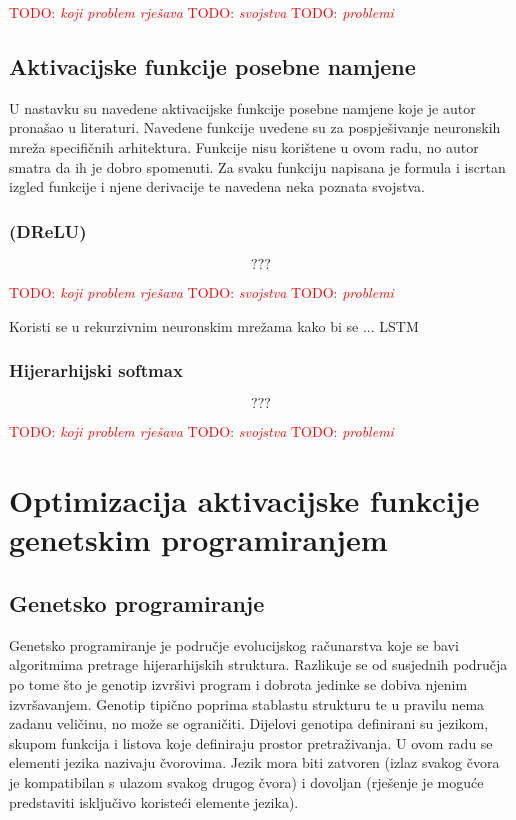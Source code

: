 \documentclass[times, utf8, numeric, diplomski]{fer}
\def\TODO#1{\noindent\textcolor{red}{TODO: \textit{#1}}\newline}
\def\todo#1{\TODO{#1}}
\def\todoimg#1{\begin{center} \textcolor{red}{\big[ IMAGE: \textit{#1} \big]} \end{center}}
\begin{document}
\todo{koji problem rješava}
\todo{svojstva}
\todo{problemi}

\section{Aktivacijske funkcije posebne namjene}
U nastavku su navedene aktivacijske funkcije posebne namjene koje je autor pronašao u literaturi. Navedene funkcije uvedene su za pospješivanje neuronskih mreža specifičnih arhitektura. Funkcije nisu korištene u ovom radu, no autor smatra da ih je dobro spomenuti. Za svaku funkciju napisana je formula i iscrtan izgled funkcije i njene derivacije te navedena neka poznata svojstva.

\subsection{(DReLU)}

\todoimg{}

\begin{equation}
???
\end{equation}

\todo{koji problem rješava}
\todo{svojstva}
\todo{problemi}

Koristi se u rekurzivnim neuronskim mrežama kako bi se ... LSTM

\subsection{Hijerarhijski softmax}

\todoimg{}

\begin{equation}
???
\end{equation}

\todo{koji problem rješava}
\todo{svojstva}
\todo{problemi}
\fi %

\chapter{Optimizacija aktivacijske funkcije genetskim programiranjem}

\section{Genetsko programiranje}
Genetsko programiranje je područje evolucijskog računarstva koje se bavi algoritmima pretrage hijerarhijskih struktura. Razlikuje se od susjednih područja po tome što je genotip izvršivi program i dobrota jedinke se dobiva njenim izvršavanjem. Genotip tipično poprima stablastu strukturu te u pravilu nema zadanu veličinu, no može se ograničiti. Dijelovi genotipa definirani su jezikom, skupom funkcija i listova koje definiraju prostor pretraživanja. U ovom radu se elementi jezika nazivaju čvorovima. Jezik mora biti zatvoren (izlaz svakog čvora je kompatibilan s ulazom svakog drugog čvora) i dovoljan (rješenje je moguće predstaviti isključivo koristeći elemente jezika). \citep{comp_intelligence}
\end{document}
